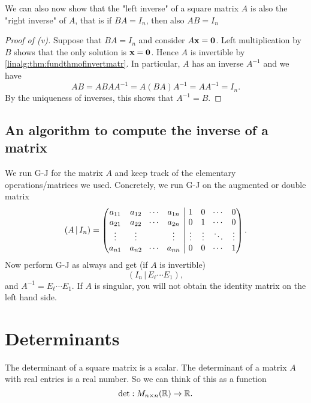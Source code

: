 \documentclass[10pt, a4paper]{article}
\begin{document}
\begin{remark}
    We can also now show that the "left inverse" of a square matrix $A$ is also the "right inverse" of $A$,
    that is if $BA = I_n$, then also $AB = I_n$
\end{remark}

\begin{proposition}[continues = pre:linalg:prop:propofinvandtransp]
    \begin{proof}[Proof of (v)]
        Suppose that $BA = I_n$ and consider $A\mathbf{x} = \mathbf{0}$.
        Left multiplication by $B$ shows that the only solution is $\mathbf{x} = \mathbf{0}$.
        Hence $A$ is invertible by \autoref{linalg:thm:fundthmofinvertmatr}.
        In particular, $A$ has an inverse $A ^ {-1}$ and we have
        \[
        AB = ABAA ^ {-1} = A(BA)A ^ {-1} = AA ^ {-1} = I_n.
        \]
        By the uniqueness of inverses, this shows that $A ^ {-1} = B$.
    \end{proof}
\end{proposition}

\subsection{An algorithm to compute the inverse of a matrix}
We run G-J for the matrix $A$ and keep track of the elementary operations/matrices we used.
Concretely, we run G-J on the augmented or double matrix
\[
(A \,|\, I_n) =
\left(\hspace{-5pt}
\begin{array}{cccc|cccc}
     a_{1 1} & a_{1 2} & \dotsi & a_{1 n} & 1 & 0 & \dotsi & 0 \\
     a_{2 1} & a_{2 2} & \dotsi & a_{2 n} & 0 & 1 & \dotsi & 0 \\
     \vdots & \vdots & \phantom{} & \vdots & \vdots & \vdots & \ddots & \vdots \\
     a_{n 1} & a_{n 2} & \dotsi & a_{n n} & 0 & 0 & \dotsi & 1
\end{array}
\hspace{-5pt}\right).
\]
Now perform G-J as always and get (if $A$ is invertible)
\[
(I_n\,|\,E_\ell \dotsi E_1),
\]
and $A ^ {-1} = E_\ell \dotsi E_1$.
If $A$ is singular,
you will not obtain the identity matrix on the left hand side.

\newpage

\section{Determinants}
The determinant of a square matrix is a scalar.
The determinant of a matrix $A$ with real entries is a real number.
So we can think of this as a function
\[
\det : M_{n \times n}(\mathbb{R}) \rightarrow \mathbb{R}.
\]
\end{document}
